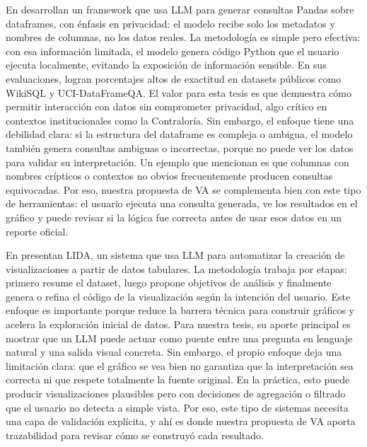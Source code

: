 En \cite{ye2024dataframe} desarrollan un framework que usa \acs{LLM} para generar consultas Pandas sobre dataframes, con énfasis en privacidad: el modelo recibe solo los metadatos y nombres de columnas, no los datos reales. La metodología es simple pero efectiva: con esa información limitada, el modelo genera código Python que el usuario ejecuta localmente, evitando la exposición de información sensible. En sus evaluaciones, logran porcentajes altos de exactitud en datasets públicos como WikiSQL y UCI-DataFrameQA. El valor para esta tesis es que demuestra cómo permitir interacción con datos sin comprometer privacidad, algo crítico en contextos institucionales como la Contraloría. Sin embargo, el enfoque tiene una debilidad clara: si la estructura del dataframe es compleja o ambigua, el modelo también genera consultas ambiguas o incorrectas, porque no puede ver los datos para validar su interpretación. Un ejemplo que mencionan es que columnas con nombres crípticos o contextos no obvios frecuentemente producen consultas equivocadas. Por eso, nuestra propuesta de \acs{VA} se complementa bien con este tipo de herramientas: el usuario ejecuta una consulta generada, ve los resultados en el gráfico y puede revisar si la lógica fue correcta antes de usar esos datos en un reporte oficial.

En \cite{dibia2023lida} presentan LIDA, un sistema que usa \acs{LLM} para automatizar la creación de visualizaciones a partir de datos tabulares. La metodología trabaja por etapas: primero resume el dataset, luego propone objetivos de análisis y finalmente genera o refina el código de la visualización según la intención del usuario. Este enfoque es importante porque reduce la barrera técnica para construir gráficos y acelera la exploración inicial de datos. Para nuestra tesis, su aporte principal es mostrar que un \acs{LLM} puede actuar como puente entre una pregunta en lenguaje natural y una salida visual concreta. Sin embargo, el propio enfoque deja una limitación clara: que el gráfico se vea bien no garantiza que la interpretación sea correcta ni que respete totalmente la fuente original. En la práctica, esto puede producir visualizaciones plausibles pero con decisiones de agregación o filtrado que el usuario no detecta a simple vista. Por eso, este tipo de sistemas necesita una capa de validación explícita, y ahí es donde nuestra propuesta de \acs{VA} aporta trazabilidad para revisar cómo se construyó cada resultado.

